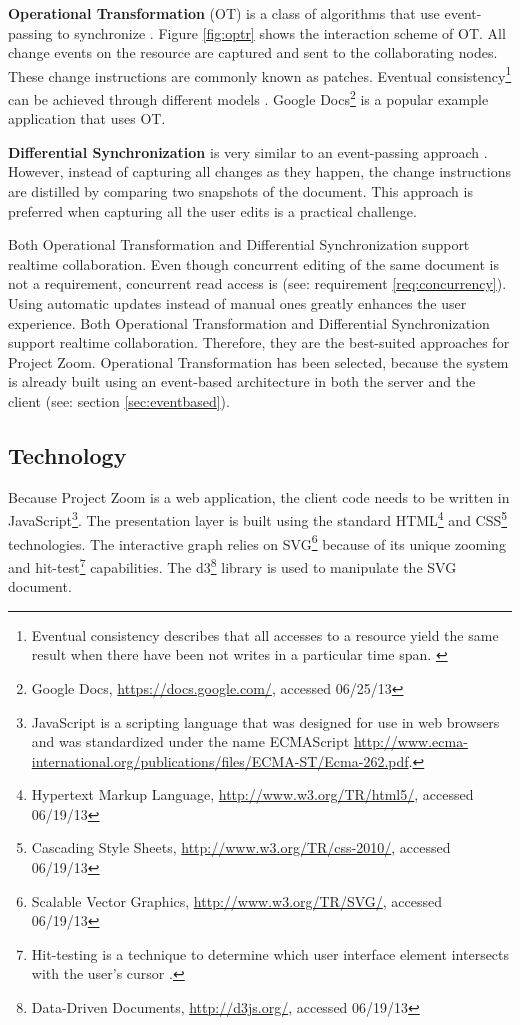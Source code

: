 \textbf{Operational Transformation} (OT) is a class of algorithms that use event-passing to synchronize \cite{Ellis_1989}. Figure \ref{fig:optr} shows the interaction scheme of OT. All change events on the resource are captured and sent to the collaborating nodes. These change instructions are commonly known as patches. Eventual consistency\footnote{Eventual consistency describes that all accesses to a resource yield the same result when there have been not writes in a particular time span. \cite{Gustavsson_2002}} can be achieved through different models \cite{Sun_1998} \cite{Li_2004} \cite{Li_2005}. Google Docs\footnote{Google Docs, \url{https://docs.google.com/}, accessed 06/25/13} is a popular example application that uses OT.

\textbf{Differential Synchronization} is very similar to an event-passing approach \cite{Fraser_2009}. However, instead of capturing all changes as they happen, the change instructions are distilled by comparing two snapshots of the document. This approach is preferred when capturing all the user edits is a practical challenge.

Both Operational Transformation and Differential Synchronization support realtime collaboration. Even though concurrent editing of the same document is not a requirement, concurrent read access is (see: requirement \ref{req:concurrency}). Using automatic updates instead of manual ones greatly enhances the user experience. Both Operational Transformation and Differential Synchronization support realtime collaboration. Therefore, they are the best-suited approaches for Project Zoom. Operational Transformation has been selected, because the system is already built using an event-based architecture in both the server \cite{Bocklisch_2013} and the client (see: section \ref{sec:eventbased}).

\subsection{Technology}
Because Project Zoom is a web application, the client code needs to be written in JavaScript\footnote{JavaScript is a scripting language that was designed for use in web browsers and was standardized under the name ECMAScript \url{http://www.ecma-international.org/publications/files/ECMA-ST/Ecma-262.pdf}.}. The presentation layer is built using the standard HTML\footnote{Hypertext Markup Language, \url{http://www.w3.org/TR/html5/}, accessed 06/19/13} and CSS\footnote{Cascading Style Sheets, \url{http://www.w3.org/TR/css-2010/}, accessed 06/19/13} technologies. The interactive graph relies on SVG\footnote{Scalable Vector Graphics, \url{http://www.w3.org/TR/SVG/}, accessed 06/19/13} because of its unique zooming and hit-test\footnote{Hit-testing is a technique to determine which user interface element intersects with the user's cursor \cite{Foley_1995}.} capabilities. The d3\footnote{Data-Driven Documents, \url{http://d3js.org/}, accessed 06/19/13} library is used to manipulate the SVG document.

